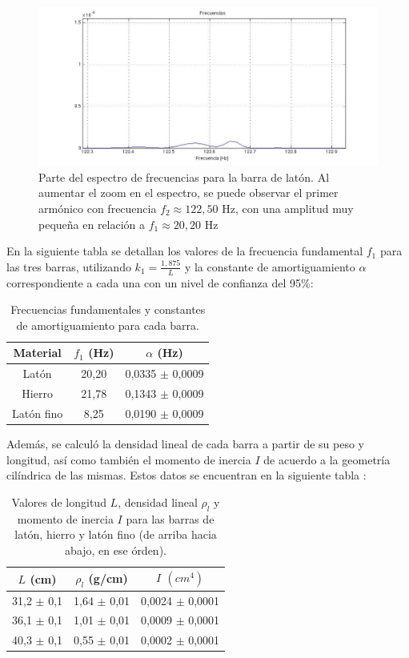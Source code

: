 \documentclass[twoside,twocolumn,a4paper]{article}
\begin{document}
\begin{figure}[H]
\includegraphics[width=\linewidth]{espectrolatonarmonico.jpg}
\caption{Parte del espectro de frecuencias para la barra de lat\'on. Al aumentar el zoom en el espectro, se puede observar el primer arm\'onico con frecuencia $f_{2} \approx 122,50$ Hz, con una amplitud muy peque\~na en relaci\'on a $f_{1} \approx 20,20$ Hz}
\label{fig:espectrolatonarmonico}
\end{figure}


En la siguiente tabla se detallan los valores de la frecuencia fundamental $f_{1}$ para las tres barras, utilizando $k_{1} = \frac{1,875}{L}$ y la constante de amortiguamiento $\alpha$ correspondiente a cada una con un nivel de confianza del 95\%:


\begin{table}[H]
\centering
\caption{Frecuencias fundamentales y constantes de amortiguamiento para cada barra.}
\label{tab:fya_barras}
\begin{tabular}{|c|c|c|}
\hline
Material & $f_{1}$ (Hz) & $\alpha$ (Hz) \\ \hline
Lat\'on & 20,20 & 0,0335 $\pm$ 0,0009\\ \hline
Hierro & 21,78 & 0,1343 $\pm$ 0,0009  \\ \hline
Lat\'on fino & 8,25 & 0,0190 $\pm$ 0,0009\\ \hline
\end{tabular}
\end{table}


Adem\'as, se calcul\'o la densidad lineal de cada barra a partir de su peso y longitud, as\'i como tambi\'en el momento de inercia $I$ de acuerdo a la geometr\'ia cil\'indrica de las mismas. Estos datos se encuentran en la siguiente tabla :

\begin{table}[H]
\centering
\caption{Valores de longitud $L$, densidad lineal $\rho_{l}$ y momento de inercia $I$ para las barras de lat\'on, hierro y lat\'on fino (de arriba hacia abajo, en ese \'orden).}
\label{tab:params_barras}
\begin{tabular}{|c|c|c|}
\hline
$L$ (cm) & $\rho_{l}$ (g/cm) & $I$ $(cm^{4})$\\ \hline
31,2 $\pm$ 0,1 & 1,64 $\pm$ 0,01 & 0,0024 $\pm$ 0,0001\\ \hline
36,1 $\pm$ 0,1 & 1,01 $\pm$ 0,01 & 0,0009 $\pm$ 0,0001\\ \hline
40,3 $\pm$ 0,1 & 0,55 $\pm$ 0,01 & 0,0002 $\pm$ 0,0001\\ \hline
\end{tabular}
\end{table}
\end{document}
